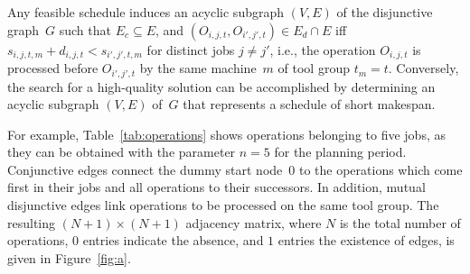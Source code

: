 Any feasible schedule induces an acyclic subgraph $(V,E)$ of 
the disjunctive graph~$G$
such that $E_c\subseteq E$, and $(O_{i,j,t},O_{i',j',t})\in E_d\cap E$
iff $s_{i,j,t,m}+d_{i,j,t} < s_{i',j',t,m}$ for distinct jobs $j\neq j'$,
i.e., the operation
$O_{i,j,t}$ is processed before $O_{i',j',t}$ by the same machine~$m$
of tool group $t_m=t$.
Conversely,
the search for a high-quality solution can be accomplished by
determining an acyclic subgraph $(V,E)$ of~$G$ that represents a schedule
of short makespan.

For example, Table~\ref{tab:operations} shows operations
belonging to five jobs, as they can
be obtained with the parameter $n=5$ for the planning period.
Conjunctive edges connect the dummy start node~$0$ to
the operations which come first in their jobs and all operations to their successors.
In addition, mutual disjunctive edges link operations
to be processed on the same tool group.
The resulting $(N+1)\times(N+1)$ adjacency matrix, where $N$ is the
total number of operations, $0$ entries indicate the absence, and
$1$ entries the existence of edges, is given in Figure~\ref{fig:a}.

